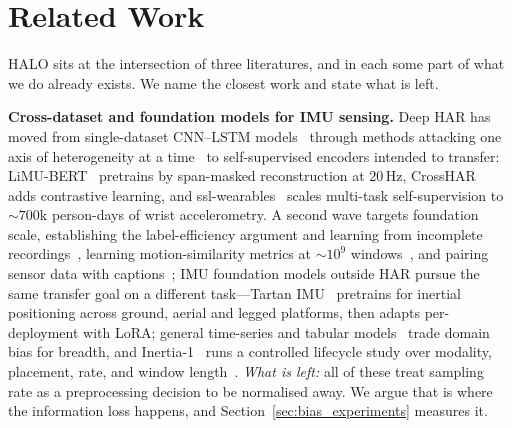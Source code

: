 
\section{Related Work}
\label{sec:related}

HALO sits at the intersection of three literatures, and in each some part of what we do already
exists. We name the closest work and state what is left.

\textbf{Cross-dataset and foundation models for IMU sensing.}
Deep HAR has moved from single-dataset CNN--LSTM models~\cite{deepconvlstm} through methods
attacking one axis of heterogeneity at a time~\cite{cosmo,unihar,clusterfl} to self-supervised
encoders intended to transfer: LiMU-BERT~\cite{limubert} pretrains by span-masked reconstruction
at $20$\,Hz, CrossHAR~\cite{crosshar} adds contrastive learning, and
ssl-wearables~\cite{sslwearables} scales multi-task self-supervision to ${\sim}700$k person-days
of wrist accelerometry. A second wave targets foundation scale, establishing the label-efficiency
argument and learning from incomplete recordings~\cite{lsm1,lsm2}, learning motion-similarity
metrics at ${\sim}10^9$ windows~\cite{relcon}, and pairing sensor data with
captions~\cite{sensorlm}; IMU foundation models outside HAR pursue the same transfer goal on a different task---Tartan
IMU~\cite{tartanimu} pretrains for inertial positioning across ground, aerial and legged
platforms, then adapts per-deployment with LoRA; general time-series and tabular
models~\cite{moment,patchtst,mitra}
trade domain bias for breadth, and Inertia-1~\cite{inertia1} runs a controlled lifecycle study
over modality, placement, rate, and window length~\cite{harfmsurvey}. \emph{What is left:} all of
these treat sampling rate as a preprocessing decision to be normalised away. We argue that is
where the information loss happens, and Section~\ref{sec:bias_experiments} measures it.

